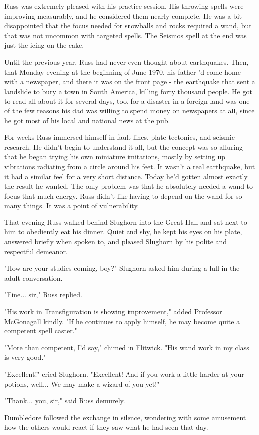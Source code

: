 \documentclass[a4paper,11pt]{article}
\begin{document}
Russ was extremely pleased with his practice session. His throwing spells were improving measurably, and he considered them nearly complete. He was a bit disappointed that the focus needed for snowballs and rocks required a wand, but that was not uncommon with targeted spells. The Seismos spell at the end was just the icing on the cake.

Until the previous year, Russ had never even thought about earthquakes. Then, that Monday evening at the beginning of June 1970, his father 'd come home with a newspaper, and there it was on the front page - the earthquake that sent a landslide to bury a town in South America, killing forty thousand people. He got to read all about it for several days, too, for a disaster in a foreign land was one of the few reasons his dad was willing to spend money on newspapers at all, since he got most of his local and national news at the pub.

For weeks Russ immersed himself in fault lines, plate tectonics, and seismic research. He didn't begin to understand it all, but the concept was so alluring that he began trying his own miniature imitations, mostly by setting up vibrations radiating from a circle around his feet. It wasn't a real earthquake, but it had a similar feel for a very short distance. Today he'd gotten almost exactly the result he wanted. The only problem was that he absolutely needed a wand to focus that much energy. Russ didn't like having to depend on the wand for so many things. It was a point of vulnerability.

That evening Russ walked behind Slughorn into the Great Hall and sat next to him to obediently eat his dinner. Quiet and shy, he kept his eyes on his plate, answered briefly when spoken to, and pleased Slughorn by his polite and respectful demeanor.

"How are your studies coming, boy?" Slughorn asked him during a lull in the adult conversation.

"Fine... sir," Russ replied.

"His work in Transfiguration is showing improvement," added Professor McGonagall kindly. "If he continues to apply himself, he may become quite a competent spell caster."

"More than competent, I'd say," chimed in Flitwick. "His wand work in my class is very good."

"Excellent!" cried Slughorn. "Excellent! And if you work a little harder at your potions, well... We may make a wizard of you yet!"

"Thank... you, sir," said Russ demurely.

Dumbledore followed the exchange in silence, wondering with some amusement how the others would react if they saw what he had seen that day.
\end{document}
